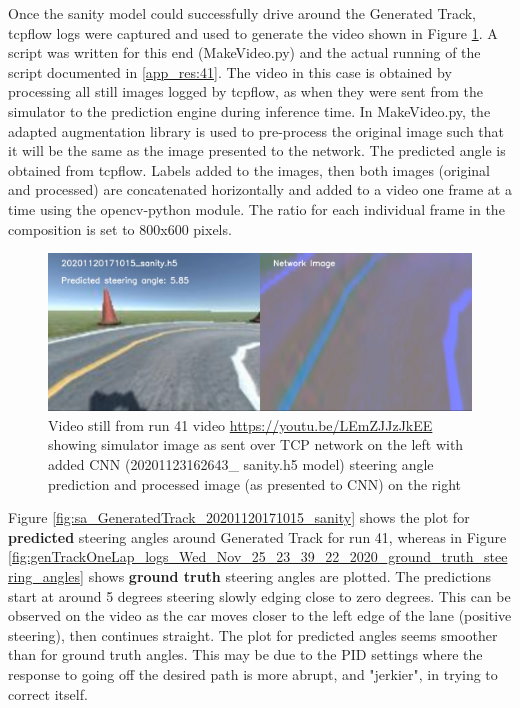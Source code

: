 Once the sanity model could successfully drive around the Generated Track, tcpflow logs were captured and used to generate the video shown in Figure \ref{fig:20201120171015_sanity_sim_network}. A script was written for this end (MakeVideo.py) and the actual running of the script documented in \ref{app_res:41}. The video in this case is obtained by processing all still images logged by tcpflow, as when they were sent from the simulator to the prediction engine during inference time. In MakeVideo.py, the adapted \cite{Naoki2016} augmentation library is used to pre-process the original image such that it will be the same as the image presented to the network. The predicted angle is obtained from tcpflow. Labels added to the images, then both images (original and processed) are concatenated horizontally and added to a video one frame at a time using the opencv-python module. The ratio for each individual frame in the composition is set to 800x600 pixels.
\begin{figure}[ht]
 \centering 
 \includegraphics[width=\textwidth]{Figures/20201120171015_sanity_sim_network.png}
 \caption{Video still from run 41 video  \url{https://youtu.be/LEmZJJzJkEE} showing simulator image as sent over TCP network on the left with added CNN (20201123162643\_ sanity.h5 model) steering angle prediction and processed image (as presented to CNN) on the right}
 \label{fig:20201120171015_sanity_sim_network} 
\end{figure}

Figure \ref{fig:sa_GeneratedTrack_20201120171015_sanity} shows the plot for \textbf{predicted} steering angles around Generated Track for run 41, whereas in Figure \ref{fig:genTrackOneLap_logs_Wed_Nov_25_23_39_22_2020_ground_truth_steering_angles} shows \textbf{ground truth} steering angles are plotted. The predictions start at around 5 degrees steering slowly edging close to zero degrees. This can be observed on the video as the car moves closer to the left edge of the lane (positive steering), then continues straight.
The plot for predicted angles seems smoother than for ground truth angles. This may be due to the PID settings where the response to going off the desired path is more abrupt, and "jerkier", in trying to correct itself.

